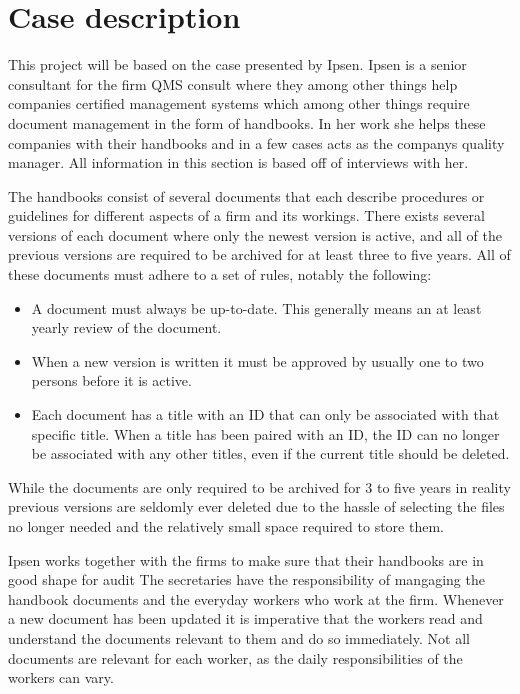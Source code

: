 \section{Case description} \label{sec:CaseDescription}

This project will be based on the case presented by Ipsen. 
Ipsen is a senior consultant for the firm QMS consult where they among other things help companies certified management systems which among other things require document management in the form of handbooks.
In her work she helps these companies with their handbooks and in a few cases acts as the companys quality manager.
All information in this section is based off of interviews with her.

The handbooks consist of several documents that each describe procedures or guidelines for different aspects of a firm and its workings.
There exists several versions of each document where only the newest version is active, and all of the previous versions are required to be archived for at least three to five years. All of these documents must adhere to a set of rules, notably the following:

\begin{itemize}
\item A document must always be up-to-date.
This generally means an at least yearly review of the document.
\item When a new version is written it must be approved by usually one to two persons before it is active.
\item Each document has a title with an ID that can only be associated with that specific title. 
When a title has been paired with an ID, the ID can no longer be associated with any other titles, even if the current title should be deleted.
\end{itemize}

While the documents are only required to be archived for 3 to five years in reality previous versions are seldomly ever deleted due to the hassle of selecting the files no longer needed and the relatively small space required to store them.

Ipsen works together with the firms to make sure that their handbooks are in good shape for audit
The secretaries have the responsibility of mangaging the handbook documents and the everyday workers who work at the firm.
Whenever a new document has been updated it is imperative that the workers read and understand the documents relevant to them and do so immediately.
Not all documents are relevant for each worker, as the daily responsibilities of the workers can vary.

